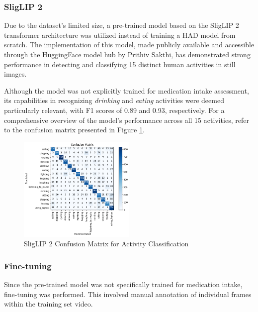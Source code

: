 \documentclass[a4paper,12pt]{article}
\begin{document}
\subsubsection{SligLIP 2}
Due to the dataset's limited size, a pre-trained model based on the SligLIP 2
transformer architecture was utilized instead of training a HAD model from scratch.
The implementation of this model, made publicly available and accessible through the
HuggingFace model hub by Prithiv Sakthi, has demonstrated strong performance
in detecting and classifying 15 distinct human activities in still images.

Although the model was not explicitly trained for medication intake assessment, its
capabilities in recognizing \textit{drinking} and \textit{eating} activities were
deemed particularly relevant, with F1 scores of 0.89 and 0.93, respectively. For a
comprehensive overview of the model's performance across all 15 activities, refer to
the confusion matrix presented in Figure
\ref{fig:HAD-cm}.

\begin{figure}[H]
    \centering
    \includegraphics[width=0.5\textwidth]{./images/conf matrix had.png} 
    \caption{SligLIP 2 Confusion Matrix for Activity Classification}
    \label{fig:HAD-cm}
\end{figure}

\subsubsection{Fine-tuning}
Since the pre-trained model was not specifically trained for medication intake, fine-tuning was performed. This involved manual annotation of individual frames within the training set video. 
\end{document}
